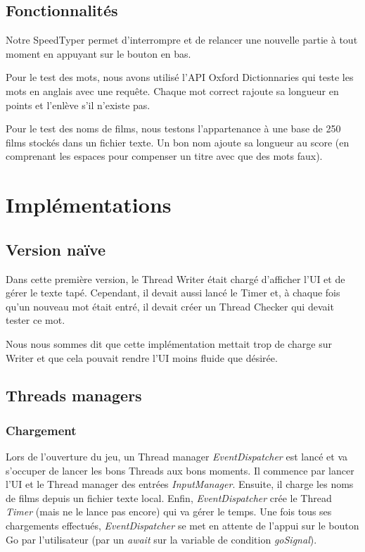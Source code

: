 \documentclass[a4paper,11pt]{article}
\begin{document}
\subsection{Fonctionnalités}
Notre SpeedTyper permet d'interrompre et de relancer une nouvelle partie à tout moment en appuyant sur le bouton en bas.\par
Pour le test des mots, nous avons utilisé l'API Oxford Dictionnaries qui teste les mots en anglais avec une requête. Chaque mot correct rajoute sa longueur en points et l'enlève s'il n'existe pas.\par
Pour le test des noms de films, nous testons l'appartenance à une base de 250 films stockés dans un fichier texte. Un bon nom ajoute sa longueur au score (en comprenant les espaces pour compenser un titre avec que des mots faux).\par
\vspace{1cm}

\section{Implémentations}
\subsection{Version naïve}
Dans cette première version, le Thread Writer était chargé d'afficher l'UI et de gérer le texte tapé. Cependant, il devait aussi lancé le Timer et, à chaque fois qu'un nouveau mot était entré, il devait créer un Thread Checker qui devait tester ce mot.\par
Nous nous sommes dit que cette implémentation mettait trop de charge sur Writer et que cela pouvait rendre l'UI moins fluide que désirée.\par


\subsection{Threads managers}
\subsubsection{Chargement}
Lors de l'ouverture du jeu, un Thread manager \textit{EventDispatcher} est lancé et va s'occuper de lancer les bons Threads aux bons moments. Il commence par lancer l'UI et le Thread manager des entrées \textit{InputManager}. Ensuite, il charge les noms de films depuis un fichier texte local. Enfin, \textit{EventDispatcher} crée le Thread \textit{Timer} (mais ne le lance pas encore) qui va gérer le temps. Une fois tous ses chargements effectués, \textit{EventDispatcher} se met en attente de l'appui sur le bouton Go par l'utilisateur (par un \textit{await} sur la variable de condition \textit{goSignal}).\par
\end{document}
